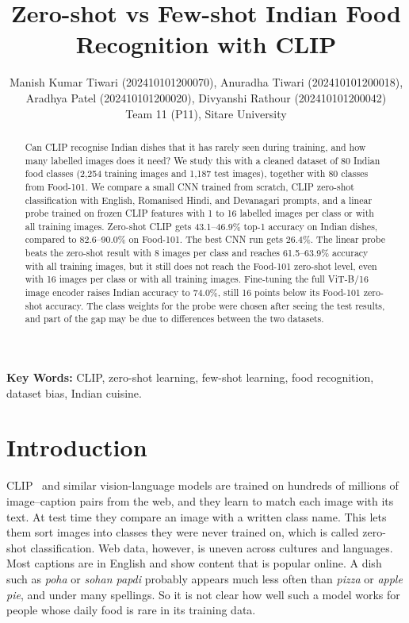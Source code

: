 \documentclass[twoside,a4paper,11pt]{article}
\begin{document}
\title{Zero-shot vs Few-shot Indian Food Recognition with CLIP}
\author{Manish Kumar Tiwari (202410101200070), Anuradha Tiwari (202410101200018),\\
Aradhya Patel (202410101200020), Divyanshi Rathour (202410101200042)\\
Team 11 (P11), Sitare University}
\maketitle

\begin{abstract}
Can CLIP recognise Indian dishes that it has rarely seen during training, and how many labelled images does it need? We study this with a cleaned dataset of 80 Indian food classes (2{,}254 training images and 1{,}187 test images), together with 80 classes from Food-101. We compare a small CNN trained from scratch, CLIP zero-shot classification with English, Romanised Hindi, and Devanagari prompts, and a linear probe trained on frozen CLIP features with 1 to 16 labelled images per class or with all training images. Zero-shot CLIP gets 43.1--46.9\% top-1 accuracy on Indian dishes, compared to 82.6--90.0\% on Food-101. The best CNN run gets 26.4\%. The linear probe beats the zero-shot result with 8 images per class and reaches 61.5--63.9\% accuracy with all training images, but it still does not reach the Food-101 zero-shot level, even with 16 images per class or with all training images. Fine-tuning the full ViT-B/16 image encoder raises Indian accuracy to 74.0\%, still 16 points below its Food-101 zero-shot accuracy. The class weights for the probe were chosen after seeing the test results, and part of the gap may be due to differences between the two datasets.
\end{abstract}

\noindent\textbf{Key Words:} CLIP, zero-shot learning, few-shot learning, food recognition, dataset bias, Indian cuisine.

\section{Introduction}
CLIP~\cite{radford2021clip} and similar vision-language models are trained on hundreds of millions of
image--caption pairs from the web, and they learn to match each image with its text. At test time they compare an
image with a written class name. This lets them sort images into classes they were never trained on, which is
called zero-shot classification. Web data, however, is uneven across cultures and languages. Most captions are in
English and show content that is popular online. A dish such as \emph{poha} or \emph{sohan papdi} probably appears
much less often than \emph{pizza} or \emph{apple pie}, and under many spellings. So it is not clear how well such a
model works for people whose daily food is rare in its training data.
\end{document}
